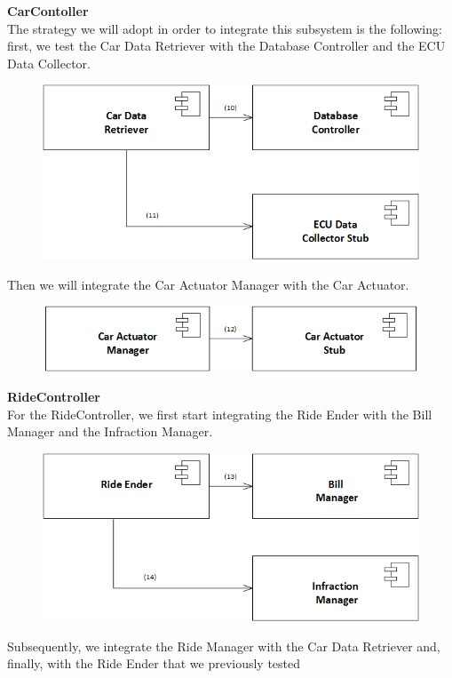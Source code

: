 \documentclass{article}
\begin{document}
\textbf{CarContoller}
\\
The strategy we will adopt in order to integrate this subsystem is the following: first, we test the Car Data Retriever with the Database Controller and the ECU Data Collector.
\begin{figure}[H]
\includegraphics[scale=0.5]{CarController/CarController1}
\centering
\end{figure}
Then we will integrate the Car Actuator Manager with the Car Actuator.
\begin{figure}[H]
\includegraphics[scale=0.5]{CarController/CarController2}
\centering
\end{figure}
\textbf{RideController}
\\
For the RideController, we first start integrating the Ride Ender with the Bill Manager and the Infraction Manager.
\begin{figure}[H]
\includegraphics[scale=0.5]{RideController/RideController1}
\centering
\end{figure}
Subsequently, we integrate the Ride Manager with the Car Data Retriever  and, finally, with the Ride Ender that we previously tested
\end{document}
